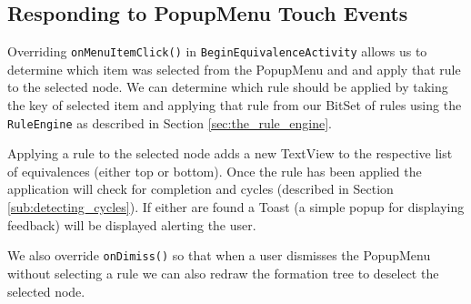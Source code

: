 \documentclass{report}
\begin{document}
\subsection{Responding to PopupMenu Touch Events}
\label{sub:responding_to_popupmenu_touch_events}

Overriding {\tt onMenuItemClick()} in {\tt BeginEquivalenceActivity} allows us to determine which item was selected from the PopupMenu and and apply that rule to the selected node. We can determine which rule should be applied by taking the key of selected item and applying that rule from our BitSet of rules using the {\tt RuleEngine} as described in Section \ref{sec:the_rule_engine}.

Applying a rule to the selected node adds a new TextView to the respective list of equivalences (either top or bottom). Once the rule has been applied the application will check for completion and cycles (described in Section \ref{sub:detecting_cycles}). If either are found a Toast (a simple popup for displaying feedback) will be displayed alerting the user.

We also override {\tt onDimiss()} so that when a user dismisses the PopupMenu without selecting a rule we can also redraw the formation tree to deselect the selected node.
\end{document}
